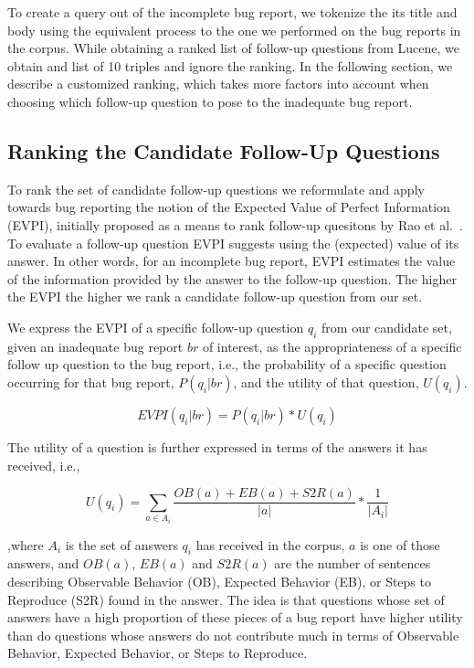 To create a query out of the incomplete bug report, we tokenize the its title and body
using the equivalent process to the one we performed on the bug reports in the corpus.
While obtaining a ranked list of follow-up questions from Lucene, we obtain and list of 10
triples and ignore the ranking. In the following section, we describe a customized ranking, which
takes more factors into account when choosing which follow-up question to pose to the inadequate
bug report.


\subsection{Ranking the Candidate Follow-Up Questions}

To rank the set of candidate follow-up questions we reformulate and apply towards bug reporting
the notion of the Expected Value of Perfect Information (EVPI), initially proposed as a means to
rank follow-up quesitons by Rao et al.~\cite{rao-daume-iii-2018-learning}. To evaluate a follow-up question EVPI suggests
using the (expected) value of its answer. In other words, for an
incomplete bug report, EVPI estimates the value of the information provided by the answer to the
follow-up question. The higher the EVPI the higher we rank a candidate follow-up question from our
set.

We express the EVPI of a specific follow-up question $q_{i}$ from our candidate set, given an inadequate
bug report $br$ of interest, as the appropriateness of a specific follow up question to the bug report, i.e.,
the probability of a specific question occurring for that bug report, $P(q_{i}|br)$, and the utility of that question, $U(q_{i})$.

$$EVPI(q_{i}|br) = P(q_{i}|br) * U(q_{i})$$

The utility of a question is further expressed in terms of the answers it has received, i.e.,

$$U(q_{i}) = \sum_{a \in A_{i}}^{} \frac{OB(a)+EB(a)+S2R(a)}{|a|} * \frac{1}{|A_{i}|}$$

,where $A_{i}$ is the set of answers $q_{i}$ has received in the corpus, $a$ is one of those answers, and
$OB(a)$, $EB(a)$ and $S2R(a)$ are the number of sentences describing Observable Behavior (OB), Expected Behavior (EB), or
Steps to Reproduce (S2R) found in the answer. The idea is that questions whose set of answers have a high proportion
of these pieces of a bug report have higher utility than do questions whose answers do not contribute much in
terms of Observable Behavior, Expected Behavior, or Steps to Reproduce.

